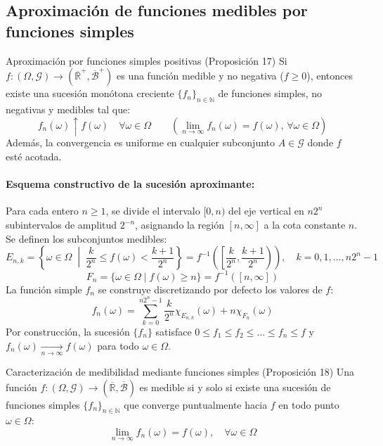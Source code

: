 \subsection{Aproximación de funciones medibles por funciones simples}

\begin{proposicion}{Aproximación por funciones simples positivas (Proposición 17)}
Si $f : (\Omega, \mathcal{G}) \to (\overline{\mathbb{R}}^+, \overline{\mathcal{B}}^+)$ es una función medible y no negativa ($f \ge 0$), entonces existe una sucesión monótona creciente $\{f_n\}_{n \in \mathbb{N}}$ de funciones simples, no negativas y medibles tal que:
\[
    f_n(\omega) \uparrow f(\omega) \quad \forall \omega \in \Omega \qquad \left(\lim_{n \to \infty} f_n(\omega) = f(\omega), \, \forall \omega \in \Omega\right)
\]
Además, la convergencia es uniforme en cualquier subconjunto $A \in \mathcal{G}$ donde $f$ esté acotada.
\end{proposicion}

\paragraph{Esquema constructivo de la sucesión aproximante:}
Para cada entero $n \ge 1$, se divide el intervalo $[0, n)$ del eje vertical en $n 2^n$ subintervalos de amplitud $2^{-n}$, asignando la región $[n, \infty]$ a la cota constante $n$. Se definen los subconjuntos medibles:
\[
    E_{n,k} = \left\{ \omega \in \Omega \;\middle|\; \frac{k}{2^n} \le f(\omega) < \frac{k+1}{2^n} \right\} = f^{-1}\left( \left[ \frac{k}{2^n}, \frac{k+1}{2^n} \right) \right), \quad k = 0, 1, \dots, n 2^n - 1
\]
\[
    F_n = \{ \omega \in \Omega \mid f(\omega) \ge n \} = f^{-1}([n, \infty])
\]
La función simple $f_n$ se construye discretizando por defecto los valores de $f$:
\[
    f_n(\omega) = \sum_{k=0}^{n 2^n - 1} \frac{k}{2^n} \chi_{E_{n,k}}(\omega) + n \chi_{F_n}(\omega)
\]
Por construcción, la sucesión $\{f_n\}$ satisface $0 \le f_1 \le f_2 \le \dots \le f_n \le f$ y $f_n(\omega) \xrightarrow[n \to \infty]{} f(\omega)$ para todo $\omega \in \Omega$.

\begin{proposicion}{Caracterización de medibilidad mediante funciones simples (Proposición 18)}
Una función $f : (\Omega, \mathcal{G}) \to (\overline{\mathbb{R}}, \overline{\mathcal{B}})$ es medible si y solo si existe una sucesión de funciones simples $\{f_n\}_{n \in \mathbb{N}}$ que converge puntualmente hacia $f$ en todo punto $\omega \in \Omega$:
\[
    \lim_{n \to \infty} f_n(\omega) = f(\omega), \quad \forall \omega \in \Omega
\]
\end{proposicion}


